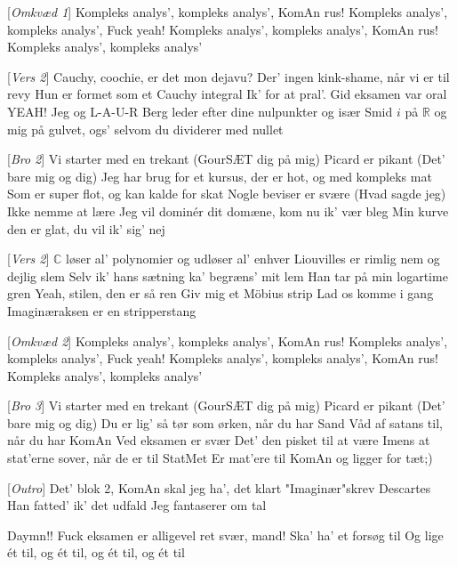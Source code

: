 \documentclass{article}
\begin{document}
\begin{song}
    [\textit{Omkvæd 1}] Kompleks analys', kompleks analys', KomAn rus!
    Kompleks analys', kompleks analys', Fuck yeah!
    Kompleks analys', kompleks analys', KomAn rus!
    Kompleks analys', kompleks analys'

    [\textit{Vers 2}] Cauchy, coochie, er det mon dejavu?
    Der' ingen kink-shame, når vi er til revy
    Hun er formet som et Cauchy integral
    Ik' for at pral'. Gid eksamen var oral
    YEAH!
    Jeg og L-A-U-R Berg
    leder efter dine nulpunkter og især
    Smid $i$ på $\mathbb{R}$ og mig på gulvet, ogs' selvom du dividerer med nullet

    [\textit{Bro 2}] Vi starter med en trekant
     (GourSÆT dig på mig)
     Picard er pikant
     (Det' bare mig og dig)
     Jeg har brug for et kursus, der er hot, og med kompleks mat
     Som er super flot, og kan kalde for skat
     Nogle beviser er svære
     (Hvad sagde jeg)
     Ikke nemme at lære
     Jeg vil dominér dit domæne, kom nu ik' vær bleg
    Min kurve den er glat, du vil ik' sig' nej

    [\textit{Vers 2}] $\mathbb{C}$ løser al' polynomier og udløser al' enhver
     Liouvilles er rimlig nem
     og dejlig slem
     Selv ik' hans sætning ka' begræns' mit lem
     Han tar på min logartime gren
    Yeah, stilen, den er så ren
    Giv mig et Möbius strip
     Lad os komme i gang
     Imaginæraksen er en stripperstang

    [\textit{Omkvæd 2}] Kompleks analys', kompleks analys', KomAn rus!
    Kompleks analys', kompleks analys', Fuck yeah!
    Kompleks analys', kompleks analys', KomAn rus!
    Kompleks analys', kompleks analys'

    [\textit{Bro 3}] Vi starter med en trekant
     (GourSÆT dig på mig)
     Picard er pikant
     (Det' bare mig og dig)
     Du er lig' så tør som ørken, når du har Sand
    Våd af satans til, når du har KomAn
     Ved eksamen er svær
    Det' den pisket til at være
     Imens at stat'erne sover, når de er til StatMet
    Er mat'ere til KomAn og ligger for tæt;)

    [\textit{Outro}] Det' blok 2, KomAn skal jeg ha', det klart
    "Imaginær"\hspace{0.1cm}skrev Descartes
    Han fatted' ik' det udfald
    Jeg fantaserer om tal

     Daymn!! Fuck eksamen er alligevel ret svær, mand!
    Ska' ha' et forsøg til
    Og lige ét til, og ét til, og ét til, og ét til
\end{song}
\end{document}
